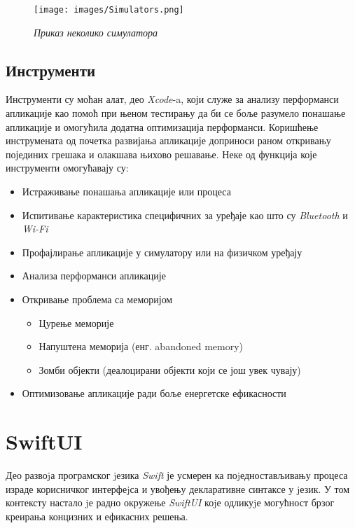 \documentclass[12pt,oneside]{memoir}
\begin{document}
\begin{figure}[H]
\texttt{[image: images/Simulators.png]}
\centering
\caption{\textit{Приказ неколико симулатора}}
\label{slika:simulatori}
\end{figure}

\subsection{Инструменти}

\indent Инструменти су моћан алат, део \textit{Xcode}-a, који служе за анализу перформанси апликације као помоћ при њеном тестирању да би се боље разумело понашање апликације и омогућила додатна оптимизација перформанси. Коришћење инструмената од почетка развијања апликације доприноси раном откривању појединих грешака и олакшава њихово решавање. 
Неке од функција које инструменти омогућавају су:
\begin{itemize}
    \item Истраживање понашања апликације или процеса
    \item Испитивање карактеристика специфичних за уређаје као што су \textit{Bluetooth} и \textit{Wi-Fi}
    \item Профајлирање апликације у симулатору или на физичком уређају
    \item Анализа перформанси апликације
    \item Откривање проблема са меморијом
    
    \begin{itemize}
        \item Цурење меморије
        \item Напуштена меморија (енг. abandoned memory)
        \item Зомби објекти (деалоцирани објекти који се још увек чувају)
    \end{itemize}
    
    \item Оптимизовање апликације ради боље енергетске ефикасности
\end{itemize}

\section{SwiftUI}
\label{sec:SwiftUI}

\indent Део развоjа програмског jезика \textit{Swift} је усмерен ка поjедностављивању процеса израде корисничког интерфеjса и увођењу декларативне синтаксе у jезик. У том контексту настало jе радно окружење \textit{SwiftUI} коjе одликуjе могућност брзог креирања концизних и ефикасних решења.
\end{document}
